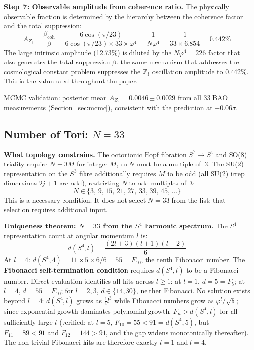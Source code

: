 \documentclass[12pt,a4paper]{article}
\begin{document}
\textbf{Step~7: Observable amplitude from coherence ratio.}
The physically observable fraction is determined by the hierarchy between
the coherence factor and the total suppression:
\begin{equation}
  A_{Z_3} = \frac{\beta_\mathrm{coh}}{\beta} = \frac{6\cos(\pi/23)}{6\cos(\pi/23)\times 33 \times \varphi^4}
  = \frac{1}{N\varphi^4} = \frac{1}{33 \times 6.854} = 0.442\%
\end{equation}
The large intrinsic amplitude (12.73\%) is diluted by the $N\varphi^4 = 226$ factor
that also generates the total suppression $\beta$: the same mechanism that addresses
the cosmological constant problem suppresses the $\mathbb{Z}_3$ oscillation amplitude
to 0.442\%. This is the value used throughout the paper.

MCMC validation: posterior mean $A_{Z_3} = 0.0046 \pm 0.0029$ from all 33 BAO
measurements (Section~\ref{sec:mcmc}), consistent with the prediction at $-0.06\sigma$.

\subsection{Number of Tori: $N = 33$}
\label{app:N33}

\textbf{What topology constrains.}
The octonionic Hopf fibration $S^7 \to S^4$ and SO(8) triality require $N = 3M$
for integer $M$, so $N$ must be a multiple of~3.  The SU(2) representation on the
$S^3$ fibre additionally requires $M$ to be odd (all SU(2) irrep dimensions $2j+1$
are odd), restricting $N$ to odd multiples of~3:
\begin{equation}
  N \in \{3,\, 9,\, 15,\, 21,\, 27,\, 33,\, 39,\, 45,\, \ldots\}
\end{equation}
This is a necessary condition.  It does not select $N = 33$ from the list;
that selection requires additional input.

\textbf{Uniqueness theorem: $N = 33$ from the $S^4$ harmonic spectrum.}
The $S^4$ representation count at angular momentum $l$ is:
\begin{equation}
  d(S^4, l) = \frac{(2l+3)(l+1)(l+2)}{6}
\end{equation}
At $l=4$: $d(S^4,4) = 11 \times 5 \times 6/6 = 55 = F_{10}$, the tenth
Fibonacci number. The \textbf{Fibonacci self-termination condition} requires
$d(S^4, l)$ to be a Fibonacci number. Direct evaluation identifies all hits
across $l \geq 1$: at $l=1$, $d = 5 = F_5$; at $l=4$, $d = 55 = F_{10}$;
for $l=2,3$, $d \in \{14, 30\}$, neither Fibonacci. No solution exists beyond
$l = 4$: $d(S^4, l)$ grows as $\tfrac{1}{3}l^3$ while Fibonacci numbers grow
as $\varphi^l/\sqrt{5}$; since exponential growth dominates polynomial growth,
$F_n > d(S^4, l)$ for all sufficiently large $l$ (verified: at $l=5$,
$F_{10} = 55 < 91 = d(S^4,5)$, but $F_{11} = 89 < 91$ and $F_{12} = 144 > 91$,
and the gap widens monotonically thereafter). The non-trivial Fibonacci hits
are therefore exactly $l = 1$ and $l = 4$.
\end{document}
